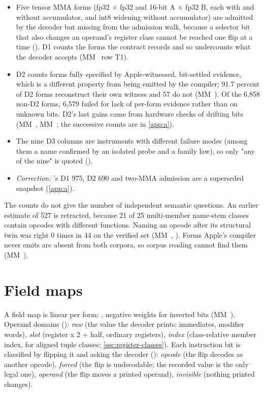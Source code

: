 \begin{itemize}
\item Five tensor MMA forms (fp32 × fp32 and 16-bit A × fp32 B, each with and without accumulator, and int8 widening
  without accumulator) are admitted by the decoder but missing from the admission walk, because a selector bit that
  also changes an operand's register class cannot be reached one flip at a time ().
  D1 counts the forms the contract records and so undercounts what the decoder accepts (MM~ row T1).
\item D2 counts forms fully specified by Apple-witnessed, bit-settled evidence, which is a different property from being
  emitted by the compiler; 91.7 percent of D2 forms reconstruct their own witness and 57 do not (MM~). Of the 6,858 non-D2 forms,
  6,579 failed for lack of per-form evidence rather than on unknown bits. D2's last gains came from hardware checks of
  drifting bits (MM~, MM~; the successive counts are in \cref{app:a}).
\item The nine D3 columns are instruments with different failure modes (among them a name confirmed by an isolated
  probe and a family law), so only "any of the nine" is quoted ().
\item \emph{Correction:} 's D1 975, D2 690 and two-MMA admission are a superseded snapshot
  (\cref{app:a}).
\end{itemize}

The counts do not give the number of independent semantic questions. An earlier estimate of 527 is retracted,
because 21 of 25 multi-member name-stem classes contain opcodes with different functions. Naming an opcode after its
structural twin was right 0 times in 44 on the verified set (MM~, ). Forms Apple's compiler never emits
are absent from both corpora, so corpus reading cannot find them (MM~).

\section{Field maps}\label{sec:field-maps}

A field map is linear per form: , negative
weights for inverted bits (MM~). Operand domains (): \emph{raw} (the value the decoder prints:
immediates, modifier words), \emph{slot} (register x 2 + half, ordinary registers), \emph{index} (class-relative member index, for
aligned tuple classes; \cref{sec:register-classes}). Each instruction bit is classified by flipping it and asking the decoder
(): \emph{opcode} (the flip decodes as another opcode), \emph{forced} (the flip is undecodable; the recorded
value is the only legal one), \emph{operand} (the flip moves a printed operand), \emph{invisible} (nothing printed changes).

